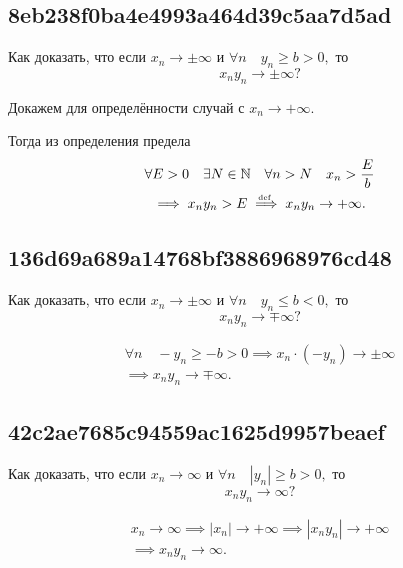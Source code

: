 \documentclass[11pt, a5paper]{article}
\newenvironment{note}[1]{\goodbreak\par\subsection{\hfill \color{lightgray}\tiny #1}}{}
\newenvironment{cloze}[2][\ldots]{\begin{leftbar}}{\end{leftbar}}
\begin{document}
    \begin{note}{8eb238f0ba4e4993a464d39c5aa7d5ad}
		Как доказать, что если \( x_n \to \pm \infty  \) и \( \forall n \quad y_n \geqslant b > 0,  \) то \[
            x_n y_n \to \pm \infty?
		\]

        \begin{cloze}{1}
            Докажем для определённости случай с \( x_n \to +\infty. \)

            Тогда из определения предела
            \begin{multline*}
                \forall E > 0 \quad \exists N \in \mathbb N \quad \forall n > N \quad x_n > \frac{E}{b} \\
                \implies x_n y_n > E \overset{\!\!\text{\tiny def}}\implies x_n y_n \to +\infty.
            \end{multline*}
        \end{cloze}
    \end{note}

    \begin{note}{136d69a689a14768bf3886968976cd48}
		Как доказать, что если \( x_n \to \pm \infty  \) и \( \forall n \quad y_n \leqslant b < 0,  \) то \[
            x_n y_n \to \mp \infty?
		\]

        \begin{cloze}{1}
            \begin{multline*}
                \forall n \quad -y_n \geqslant -b > 0
                \implies x_n \operatorname{\cdot} (-y_n) \to \pm \infty \\
                \implies x_n y_n \to \mp \infty.
            \end{multline*}
        \end{cloze}
    \end{note}

    \begin{note}{42c2ae7685c94559ac1625d9957beaef}
		Как доказать, что если \( x_n \to \infty  \) и \( \forall n \quad |y_n| \geqslant b > 0,  \) то \[
            x_n y_n \to \infty?
		\]

        \begin{cloze}{1}
            \begin{multline*}
                x_n \to \infty \implies |x_n| \to +\infty \implies |x_n y_n| \to +\infty \\
                \implies x_n y_n \to \infty.
            \end{multline*}
        \end{cloze}
    \end{note}
\end{document}
